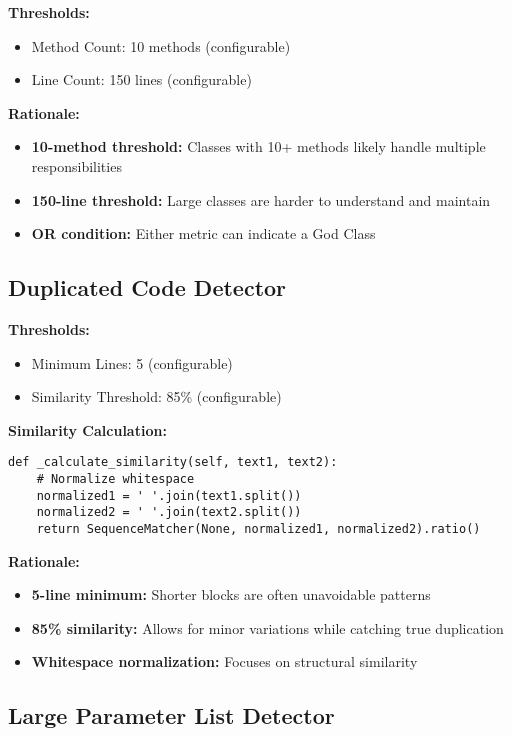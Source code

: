 \documentclass[11pt,a4paper]{article}
\begin{document}
\textbf{Thresholds:}
\begin{itemize}[noitemsep]
    \item Method Count: 10 methods (configurable)
    \item Line Count: 150 lines (configurable)
\end{itemize}

\textbf{Rationale:}
\begin{itemize}[noitemsep]
    \item \textbf{10-method threshold:} Classes with 10+ methods likely handle multiple responsibilities
    \item \textbf{150-line threshold:} Large classes are harder to understand and maintain
    \item \textbf{OR condition:} Either metric can indicate a God Class
\end{itemize}

\subsection{Duplicated Code Detector}

\textbf{Thresholds:}
\begin{itemize}[noitemsep]
    \item Minimum Lines: 5 (configurable)
    \item Similarity Threshold: 85\% (configurable)
\end{itemize}

\textbf{Similarity Calculation:}
\begin{lstlisting}[caption={Similarity Calculation}]
def _calculate_similarity(self, text1, text2):
    # Normalize whitespace
    normalized1 = ' '.join(text1.split())
    normalized2 = ' '.join(text2.split())
    return SequenceMatcher(None, normalized1, normalized2).ratio()
\end{lstlisting}

\textbf{Rationale:}
\begin{itemize}[noitemsep]
    \item \textbf{5-line minimum:} Shorter blocks are often unavoidable patterns
    \item \textbf{85\% similarity:} Allows for minor variations while catching true duplication
    \item \textbf{Whitespace normalization:} Focuses on structural similarity
\end{itemize}

\subsection{Large Parameter List Detector}
\end{document}
